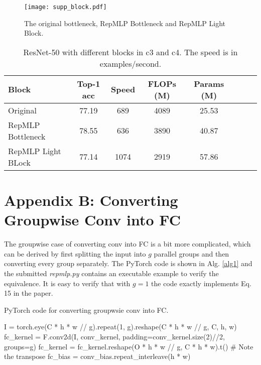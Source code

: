 \documentclass[10pt,twocolumn,letterpaper]{article}
\begin{document}
\begin{figure*}
	\begin{center}
		\texttt{[image: supp\_block.pdf]}
		\vspace{-0.05in}
		\caption{The original bottleneck, RepMLP Bottleneck and RepMLP Light Block.}
		\label{fig-block}
	\end{center}
	\vspace{-0.2in}
\end{figure*}

\setlength{\tabcolsep}{4pt}
\begin{table}
	\caption{ResNet-50 with different blocks in c3 and c4. The speed is in examples/second.}
	\label{table-fast}
	\vspace{-0.25in}
	\begin{center}
		\small
		\begin{tabular}{lccccccc}
			\hline
			Block				&	Top-1 acc	&	Speed	&	FLOPs (M)	&	Params (M)	\\
			\hline
			Original			&		77.19	&	689		&	4089		&	25.53	\\
			RepMLP Bottleneck	&		78.55	&	636		&	3890		&	40.87	\\
			RepMLP Light BLock	&		77.14	&	1074	&	2919		&	57.86	\\
			\hline
		\end{tabular}
	\end{center}
	\vspace{-0.15in}
\end{table}
\setlength{\tabcolsep}{1.4pt}

\section*{Appendix B: Converting Groupwise Conv into FC}

The groupwise case of converting conv into FC is a bit more complicated, which can be derived by first splitting the input into $g$ parallel groups and then converting every group separately. The PyTorch code is shown in Alg. \ref{alg1} and the submitted \textit{repmlp.py} contains an executable example to verify the equivalence. It is easy to verify that with $g=1$ the code exactly implements Eq. 15 in the paper.

\begin{algorithm*}
	\vskip -0.03in
	\caption{PyTorch code for converting groupwsie conv into FC.}
	\label{alg1}
	\begin{algorithmic}
		\STATE I = torch.eye(C * h * w // g).repeat(1, g).reshape(C * h * w // g, C, h, w)
		\STATE fc\_kernel = F.conv2d(I, conv\_kernel, padding=conv\_kernel.size(2)//2, groups=g)
		\STATE fc\_kernel = fc\_kernel.reshape(O * h * w // g, C * h * w).t()	\# Note the transpose
		\STATE fc\_bias = conv\_bias.repeat\_interleave(h * w)
	\end{algorithmic}
	\vskip -0.03in
\end{algorithm*} 
\end{document}
